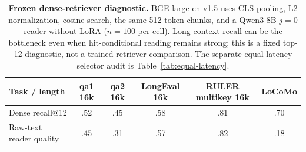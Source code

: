 \begin{table}[t]
\centering
\scriptsize
\setlength{\tabcolsep}{3.2pt}
\begin{tabular}{@{}lccccc@{}}
\toprule
\textbf{Task / length} & \textbf{qa1 16k} & \textbf{qa2 16k} &
\textbf{LongEval 16k} & \textbf{RULER multikey 16k} & \textbf{LoCoMo} \\
\midrule
Dense recall@12 & .52 & .45 & .58 & .81 & .70 \\
Raw-text reader quality & .45 & .31 & .57 & .82 & .18 \\
\bottomrule
\end{tabular}
\caption{\textbf{Frozen dense-retriever diagnostic.} BGE-large-en-v1.5 uses
CLS pooling, L2 normalization, cosine search, the same 512-token chunks, and a
Qwen3-8B $j{=}0$ reader without LoRA ($n{=}100$ per cell). Long-context recall
can be the bottleneck even when hit-conditional reading remains strong; this is
a fixed top-12 diagnostic, not a trained-retriever comparison. The separate
equal-latency selector audit is Table~\ref{tab:equal-latency}.}
\label{tab:dense-retriever}
\end{table}
